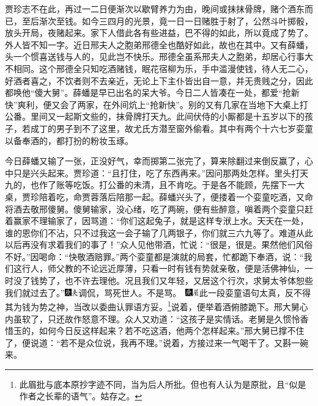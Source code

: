 贾珍志不在此，再过一二日便渐次以歇臂养力为由，晚间或抹抹骨牌，赌个酒东而已，至后渐次至钱。如今三四月的光景，竟一日一日赌胜于射了，公然斗叶掷骰，放头开局，夜赌起来。家下人借此各有些进益，巴不得的如此，所以竟成了势了。外人皆不知一字。近日邢夫人之胞弟邢德全也酷好如此，故也在其中。又有薛蟠，头一个惯喜送钱与人的，见此岂不快乐。邢德全虽系邢夫人之胞弟，却居心行事大不相同。这个邢德全只知吃酒赌钱，眠花宿柳为乐，手中滥漫使钱，待人无二心，好酒者喜之，不饮者则不去亲近，无论上下主仆皆出自一意，并无贵贱之分，因此都唤他“傻大舅”。薛蟠是早已出名的呆大爷。今日二人皆凑在一处，都爱“抢新快”爽利，便又会了两家，在外间炕上“抢新快”。别的又有几家在当地下大桌上打公番。里间又一起斯文些的，抹骨牌打天九。此间伏侍的小厮都是十五岁以下的孩子，若成丁的男子到不了这里，故尤氏方潜至窗外偷看。其中有两个十六七岁娈童以备奉酒的，都打扮的粉妆玉琢。

今日薛蟠又输了一张，正没好气，幸而掷第二张完了，算来除翻过来倒反赢了，心中只是兴头起来。贾珍道：“且打住，吃了东西再来。”因问那两处怎样。里头打天九的，也作了账等吃饭。打公番的未清，且不肯吃。于是各不能顾，先摆下一大桌，贾珍陪着吃，命贾蓉落后陪那一起。薛蟠兴头了，便搂着一个娈童吃酒，又命将酒去敬邢傻舅。傻舅输家，没心绪，吃了两碗，便有些醉意，嗔着两个娈童只赶着赢家不理输家了，因骂道：“你们这起兔子，就是这样专洑上水。天天在一处，谁的恩你们不沾，只不过我这一会子输了几两银子，你们就三六九等了。难道从此以后再没有求着我们的事了！”众人见他带酒，忙说：“很是，很是。果然他们风俗不好。”因喝命：“快敬酒赔罪。”两个娈童都是演就的局套，忙都跪下奉酒，说：“我们这行人，师父教的不论远近厚薄，只看一时有钱有势就亲敬，便是活佛神仙，一时没了钱势了，也不许去理他。况且我们又年轻，又居这个行次，求舅太爷体恕些我们就过去了。”{\includegraphics[width=3mm]{../Images/00004}\includegraphics[width=3mm]{../Images/00012}\footnotesize \kaishu 调侃，骂死世人。不是骂。　\includegraphics[width=3mm]{../Images/00004}\includegraphics[width=3mm]{../Images/00010}\footnotesize \kaishu 此一段娈童语句太真，反不得其为钱为势之神，当改以委曲认罪语方妥。}\footnote{此眉批与底本原抄字迹不同，当为后人所批。但也有人认为是原批，且“似是作者之长辈的语气”。姑存之。}说着，便举着酒俯膝跪下。邢大舅心内虽软了，只还故作怒意不理。众人又劝道：“这孩子是实情话。老舅是久惯怜香惜玉的，如何今日反这样起来？若不吃这酒，他两个怎样起来。”邢大舅已撑不住了，便说道：“若不是众位说，我再不理。”说着，方接过来一气喝干了。又斟一碗来。

